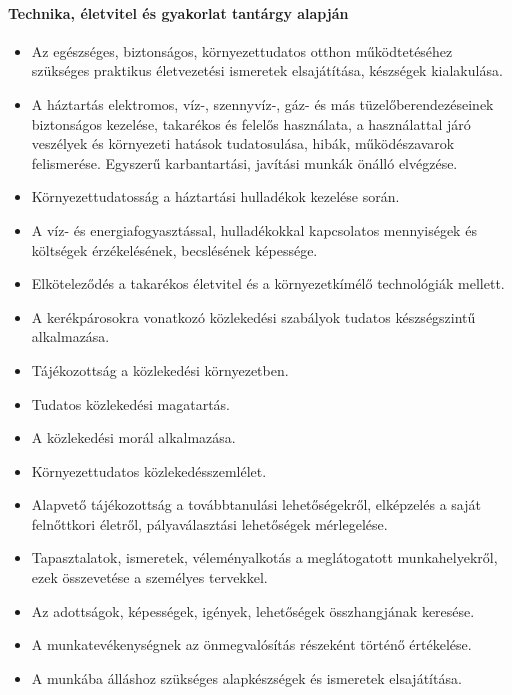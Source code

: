 \paragraph{Technika, életvitel és gyakorlat tantárgy alapján}
\begin{itemize}
\item Az egészséges, biztonságos, környezettudatos otthon működtetéséhez szükséges praktikus életvezetési ismeretek elsajátítása, készségek kialakulása.
\item A háztartás elektromos, víz-, szennyvíz-, gáz- és más tüzelőberendezéseinek biztonságos kezelése, takarékos és felelős használata, a használattal járó veszélyek és környezeti hatások tudatosulása, hibák, működészavarok felismerése. Egyszerű karbantartási, javítási munkák önálló elvégzése.
\item Környezettudatosság a háztartási hulladékok kezelése során.
\item A víz- és energiafogyasztással, hulladékokkal kapcsolatos mennyiségek és költségek érzékelésének, becslésének képessége.
\item Elköteleződés a takarékos életvitel és a környezetkímélő technológiák mellett.
\item A kerékpárosokra vonatkozó közlekedési szabályok tudatos készségszintű alkalmazása.
\item Tájékozottság a közlekedési környezetben.
\item Tudatos közlekedési magatartás.
\item A közlekedési morál alkalmazása.
\item Környezettudatos közlekedésszemlélet.
\item Alapvető tájékozottság a továbbtanulási lehetőségekről, elképzelés a saját felnőttkori életről, pályaválasztási lehetőségek mérlegelése.
\item Tapasztalatok, ismeretek, véleményalkotás a meglátogatott munkahelyekről, ezek összevetése a személyes tervekkel.
\item Az adottságok, képességek, igények, lehetőségek összhangjának keresése.
\item A munkatevékenységnek az önmegvalósítás részeként történő értékelése.
\item A munkába álláshoz szükséges alapkészségek és ismeretek elsajátítása.
\end{itemize}
